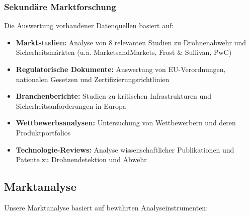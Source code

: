 \documentclass[11pt,a4paper]{article}
\begin{document}
\subsubsection*{Sekundäre Marktforschung}
Die Auswertung vorhandener Datenquellen basiert auf:
\begin{itemize}
\item \textbf{Marktstudien:} Analyse von 8 relevanten Studien zu Drohnenabwehr und Sicherheitsmärkten (u.a. MarketsandMarkets, Frost \& Sullivan, PwC)
\item \textbf{Regulatorische Dokumente:} Auswertung von EU-Verordnungen, nationalen Gesetzen und Zertifizierungsrichtlinien
\item \textbf{Branchenberichte:} Studien zu kritischen Infrastrukturen und Sicherheitsanforderungen in Europa
\item \textbf{Wettbewerbsanalysen:} Untersuchung von Wettbewerbern und deren Produktportfolios
\item \textbf{Technologie-Reviews:} Analyse wissenschaftlicher Publikationen und Patente zu Drohnendetektion und Abwehr
\end{itemize}

\subsection{Marktanalyse}

Unsere Marktanalyse basiert auf bewährten Analyseinstrumenten:
\end{document}
